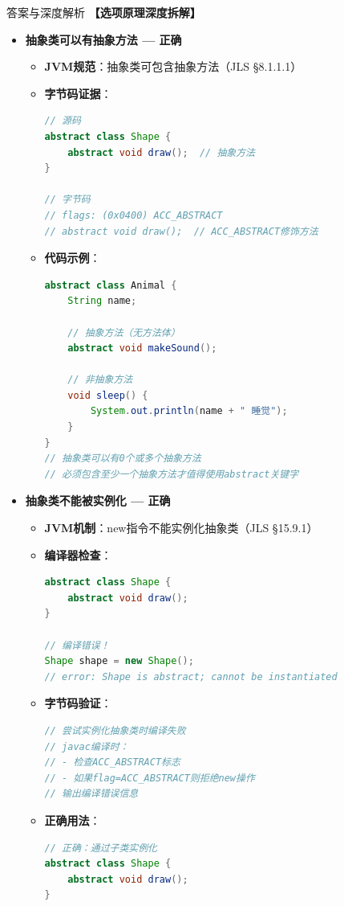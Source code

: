 \documentclass[12pt, a4paper]{ctexart}
\begin{document}
\begin{enumerate}[label=\textbf{\arabic*.}]
\begin{bluebox}{答案与深度解析}
		      \textbf{【选项原理深度拆解】}

		      \begin{itemize}[leftmargin=*, nosep, label={}]
			      \item[A] \textbf{抽象类可以有抽象方法 — 正确}
			            \begin{itemize}[label={}, leftmargin=*, nosep]
				            \item \textbf{JVM规范}：抽象类可包含抽象方法（JLS §8.1.1.1）
				            \item \textbf{字节码证据}：
				                  \begin{lstlisting}[language=Java]
// 源码
abstract class Shape {
    abstract void draw();  // 抽象方法
}

// 字节码
// flags: (0x0400) ACC_ABSTRACT
// abstract void draw();  // ACC_ABSTRACT修饰方法
				            \end{lstlisting}
				            \item \textbf{代码示例}：
				                  \begin{lstlisting}[language=Java]
abstract class Animal {
    String name;

    // 抽象方法（无方法体）
    abstract void makeSound();

    // 非抽象方法
    void sleep() {
        System.out.println(name + " 睡觉");
    }
}
// 抽象类可以有0个或多个抽象方法
// 必须包含至少一个抽象方法才值得使用abstract关键字
				      \end{lstlisting}
			            \end{itemize}

			      \item[B] \textbf{抽象类不能被实例化 — 正确}
			            \begin{itemize}[label={}, leftmargin=*, nosep]
				            \item \textbf{JVM机制}：new指令不能实例化抽象类（JLS §15.9.1）
				            \item \textbf{编译器检查}：
				                  \begin{lstlisting}[language=Java]
abstract class Shape {
    abstract void draw();
}

// 编译错误！
Shape shape = new Shape();
// error: Shape is abstract; cannot be instantiated
				      \end{lstlisting}
				            \item \textbf{字节码验证}：
				                  \begin{lstlisting}[language=Java]
// 尝试实例化抽象类时编译失败
// javac编译时：
// - 检查ACC_ABSTRACT标志
// - 如果flag=ACC_ABSTRACT则拒绝new操作
// 输出编译错误信息
				            \end{lstlisting}
				            \item \textbf{正确用法}：
				                  \begin{lstlisting}[language=Java]
// 正确：通过子类实例化
abstract class Shape {
    abstract void draw();
}


\end{lstlisting}
\end{itemize}
\end{itemize}
\end{bluebox}
\end{enumerate}
\end{document}
